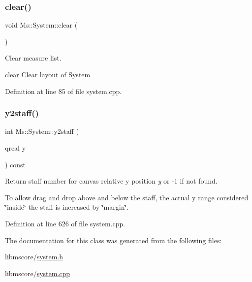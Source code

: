 \subsubsection{\texorpdfstring{clear()}{clear()}}
{\footnotesize\ttfamily void Ms\+::\+System\+::clear (\begin{DoxyParamCaption}{ }\end{DoxyParamCaption})}



Clear measure list. 

clear Clear layout of \hyperlink{class_ms_1_1_system}{System} 

Definition at line 85 of file system.\+cpp.

\mbox{\label{class_ms_1_1_system_a5a4b6ab1eb96f43699c734b1c414cecd}} 
\subsubsection{\texorpdfstring{y2staff()}{y2staff()}}
{\footnotesize\ttfamily int Ms\+::\+System\+::y2staff (\begin{DoxyParamCaption}\item[{qreal}]{y }\end{DoxyParamCaption}) const}

Return staff number for canvas relative y position {\itshape y} or -\/1 if not found.

To allow drag and drop above and below the staff, the actual y range considered \char`\"{}inside\char`\"{} the staff is increased by \char`\"{}margin\char`\"{}. 

Definition at line 626 of file system.\+cpp.



The documentation for this class was generated from the following files\+:\begin{DoxyCompactItemize}
\item 
libmscore/\hyperlink{system_8h}{system.\+h}\item 
libmscore/\hyperlink{system_8cpp}{system.\+cpp}\end{DoxyCompactItemize}
